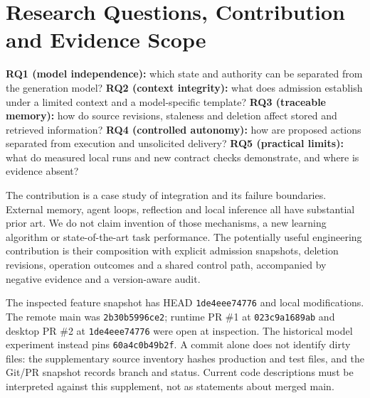 \documentclass[11pt]{article}
\begin{document}
\section{Research Questions, Contribution and Evidence Scope}\label{sec:rq}
\textbf{RQ1 (model independence):} which state and authority can be separated from the generation model? \textbf{RQ2 (context integrity):} what does admission establish under a limited context and a model-specific template? \textbf{RQ3 (traceable memory):} how do source revisions, staleness and deletion affect stored and retrieved information? \textbf{RQ4 (controlled autonomy):} how are proposed actions separated from execution and unsolicited delivery? \textbf{RQ5 (practical limits):} what do measured local runs and new contract checks demonstrate, and where is evidence absent?

The contribution is a case study of integration and its failure boundaries. External memory, agent loops, reflection and local inference all have substantial prior art. We do not claim invention of those mechanisms, a new learning algorithm or state-of-the-art task performance. The potentially useful engineering contribution is their composition with explicit admission snapshots, deletion revisions, operation outcomes and a shared control path, accompanied by negative evidence and a version-aware audit.

The inspected feature snapshot has HEAD \texttt{1de4eee74776} and local modifications. The remote main was \texttt{2b30b5996ce2}; runtime PR \#1 at \texttt{023c9a1689ab} and desktop PR \#2 at \texttt{1de4eee74776} were open at inspection. The historical model experiment instead pins \texttt{60a4c0b49b2f}. A commit alone does not identify dirty files: the supplementary source inventory hashes production and test files, and the Git/PR snapshot records branch and status. Current code descriptions must be interpreted against this supplement, not as statements about merged main.
\end{document}
